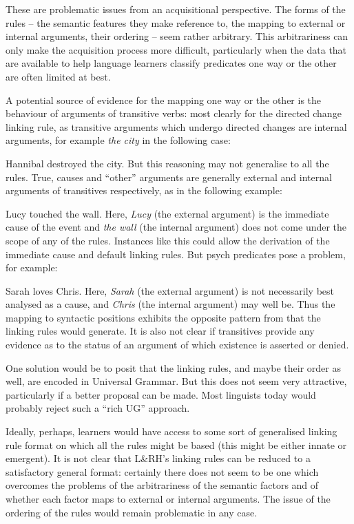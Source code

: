 \documentclass[output=paper]{langsci/langscibook}
\begin{document}
These are problematic issues from an acquisitional perspective. The forms of
the rules – the semantic features they make reference to, the mapping to
external or internal arguments, their ordering – seem rather arbitrary. This
arbitrariness can only make the acquisition process more difficult,
particularly when the data that are available to help language learners
classify predicates one way or the other are often limited at best.{}

A potential source of evidence for the mapping one way or the other is the
behaviour of arguments of transitive verbs: most clearly for the directed
change linking rule, as transitive arguments which undergo directed changes are
internal arguments, for example \emph{the city} in the following case:

\ea Hannibal destroyed the city.\z
But this reasoning may not generalise to all the rules. True, causes and
\enquote{other} arguments are generally external and internal arguments of
transitives respectively, as in the following example:

\ea Lucy touched the wall.\z
Here, \emph{Lucy} (the external argument) is the immediate cause of the event
and \emph{the wall} (the internal argument) does not come under the scope of
any of the rules. Instances like this could allow the derivation of the
immediate cause and default linking rules. But psych predicates pose a problem,
for example:

\ea Sarah loves Chris.\z
Here, \emph{Sarah} (the external argument) is not necessarily best analysed as
a cause, and \emph{Chris} (the internal argument) may well be. Thus the mapping
to syntactic positions exhibits the opposite pattern from that the linking
rules would generate. It is also not clear if transitives provide any evidence
as to the status of an argument of which existence is asserted or denied.

One solution would be to posit that the linking rules, and maybe their order as
well, are encoded in Universal Grammar. But this does not seem very attractive,
particularly if a better proposal can be made. Most linguists today would
probably reject such a \enquote{rich \gls{UG}} approach.

Ideally, perhaps, learners would have access to some sort of generalised
linking rule format on which all the rules might be based (this might be either
innate or emergent). It is not clear that L\&RH’s linking rules can be reduced
to a satisfactory general format: certainly there does not seem to be one which
overcomes the problems of the arbitrariness of the semantic factors and of
whether each factor maps to external or internal arguments. The issue of the
ordering of the rules would remain problematic in any case.
\end{document}
